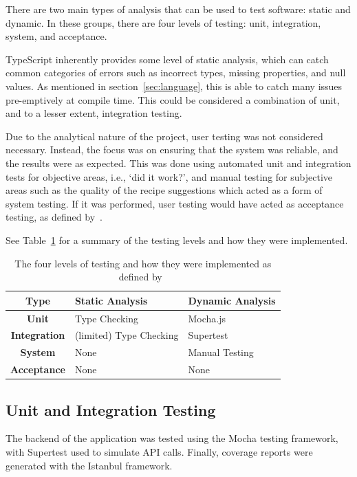There are two main types of analysis that can be used to test software: static and dynamic. In these groups, there are
four levels of testing: unit, integration, system, and acceptance.~\cite{luo_software_2001}

TypeScript inherently provides some level of static analysis, which can catch common categories of errors such as
incorrect types, missing properties, and null values. As mentioned in section~\ref{sec:language}, this is able to
catch many issues pre-emptively at compile time. This could be considered a combination of unit, and to a lesser extent,
integration testing.

Due to the analytical nature of the project, user testing was not considered necessary. Instead, the focus was on ensuring
that the system was reliable, and the results were as expected. This was done using automated unit and integration tests for
objective areas, i.e., \enquote*{did it work?}, and manual testing for subjective areas such as the quality of the recipe
suggestions which acted as a form of system testing. If it was performed, user testing would have acted as acceptance testing,
as defined by~\cite{luo_software_2001}.

See Table~\ref{tab:test_types} for a summary of the testing levels and how they were implemented.

\begin{table}[hp]
    \centering
    \caption{\label{tab:test_types}The four levels of testing and how they were implemented as defined by~\cite{luo_software_2001}}
    \begin{tabular}{cll}\toprule
        \textbf{Type} & \textbf{Static Analysis} & \textbf{Dynamic Analysis} \\\midrule
        \textbf{Unit} & Type Checking & Mocha.js \\
        \textbf{Integration} & (limited) Type Checking & Supertest \\
        \textbf{System} & None & Manual Testing \\
        \textbf{Acceptance} & None & None \\
        \bottomrule
    \end{tabular}
\end{table}

\subsection{Unit and Integration Testing}
The backend of the application was tested using the Mocha testing framework, with Supertest
used to simulate API calls. Finally, coverage reports were generated with the Istanbul framework.

